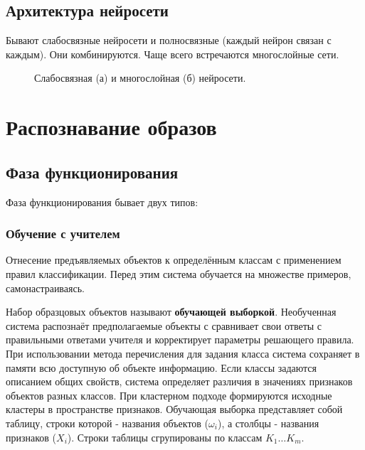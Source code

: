		\subsection{Архитектура нейросети}
			Бывают слабосвязные нейросети и полносвязные (каждый нейрон связан с каждым). Они комбинируются.
			Чаще всего встречаются многослойные сети.
            \begin{figure}[h]
            \begin{minipage}[h]{0.49\linewidth}
            \end{minipage}
            \hfill
            \begin{minipage}[h]{0.49\linewidth}
            \end{minipage}
            \caption{Слабосвязная (а) и многослойная (б) нейросети.}
            \label{ris:image1}
            \end{figure}
    \section{Распознавание образов}
        
        
        \subsection{Фаза функционирования}
        Фаза функционирования бывает двух типов:
            \subsubsection{Обучение с учителем}
            
                Отнесение предъявляемых объектов к определённым классам с применением правил классификации. Перед этим система обучается на множестве примеров, самонастраиваясь.
                
                Набор образцовых объектов называют \textbf{обучающей выборкой}. Необученная система распознаёт предполагаемые объекты с сравнивает свои ответы с правильными ответами учителя и корректирует параметры решающего правила. При использовании метода перечисления 
                для задания класса система сохраняет в памяти всю доступную об объекте информацию. Если классы задаются описанием общих свойств, система определяет различия в значениях признаков объектов разных классов. При кластерном подходе формируются исходные кластеры в пространстве признаков. Обучающая выборка представляет собой таблицу, строки которой - названия объектов ($\omega_i$), а столбцы - названия признаков ($X_i$). Строки таблицы сгрупированы по классам $K_1 \dots K_m$.
                
